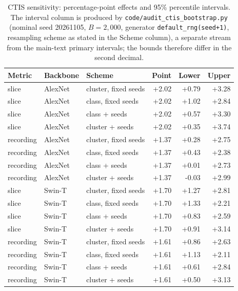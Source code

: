 \begin{table}[ht]\centering\scriptsize\caption{CTIS sensitivity: percentage-point effects and 95\% percentile intervals. The interval column is produced by \texttt{code/audit\_ctis\_bootstrap.py} (nominal seed 20261105, $B=2{,}000$, generator \texttt{default\_rng(seed+1)}, resampling scheme as stated in the Scheme column), a separate stream from the main-text primary intervals; the bounds therefore differ in the second decimal.}

\begin{tabular}{lllrrr}\toprule Metric & Backbone & Scheme & Point & Lower & Upper \\ \midrule

slice & AlexNet & cluster, fixed seeds & +2.02 & +0.79 & +3.28 \\

slice & AlexNet & class, fixed seeds & +2.02 & +1.02 & +2.84 \\

slice & AlexNet & class + seeds & +2.02 & +0.57 & +3.30 \\

slice & AlexNet & cluster + seeds & +2.02 & +0.35 & +3.74 \\

recording & AlexNet & cluster, fixed seeds & +1.37 & +0.28 & +2.75 \\

recording & AlexNet & class, fixed seeds & +1.37 & +0.43 & +2.38 \\

recording & AlexNet & class + seeds & +1.37 & +0.01 & +2.73 \\

recording & AlexNet & cluster + seeds & +1.37 & -0.03 & +2.99 \\

slice & Swin-T & cluster, fixed seeds & +1.70 & +1.27 & +2.81 \\

slice & Swin-T & class, fixed seeds & +1.70 & +1.33 & +2.21 \\

slice & Swin-T & class + seeds & +1.70 & +0.83 & +2.59 \\

slice & Swin-T & cluster + seeds & +1.70 & +0.91 & +3.14 \\

recording & Swin-T & cluster, fixed seeds & +1.61 & +0.86 & +2.63 \\

recording & Swin-T & class, fixed seeds & +1.61 & +1.13 & +2.11 \\

recording & Swin-T & class + seeds & +1.61 & +0.61 & +2.84 \\

recording & Swin-T & cluster + seeds & +1.61 & +0.50 & +3.13 \\

\bottomrule\end{tabular}\end{table}


